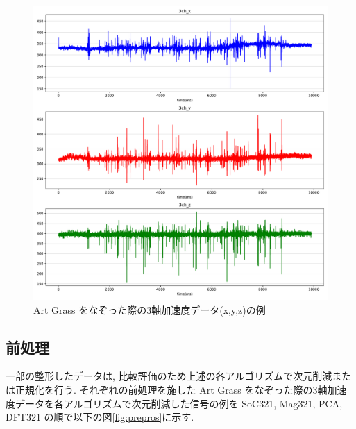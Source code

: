 \begin{figure}[H]
    \begin{center}
    \includegraphics[width=12cm]{eps/3ch.pdf}
    \caption{Art Grass をなぞった際の3軸加速度データ(x,y,z)の例}
    \label{fig:3ch}
   \end{center}
   \end{figure}

\subsection{前処理}
一部の整形したデータは, 比較評価のため上述の各アルゴリズムで次元削減または正規化を行う. 
それぞれの前処理を施した Art Grass をなぞった際の3軸加速度データを各アルゴリズムで次元削減した信号の例を SoC321, Mag321, PCA, DFT321 の順で以下の図\ref{fig:prepros}に示す. 

